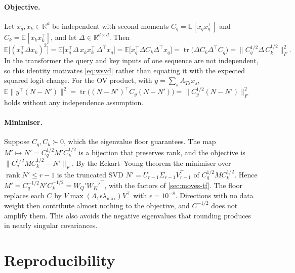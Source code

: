 \documentclass[11pt,a4paper]{article}
\theoremstyle{definition}
\newcommand{\R}{\mathbb{R}}
\newcommand{\E}{\mathbb{E}}
\DeclareMathOperator{\rank}{rank}
\begin{document}
\paragraph{Objective.} Let $x_q,x_k\in\R^{d}$ be independent with second moments
$C_q=\E[x_qx_q^{\top}]$ and $C_k=\E[x_kx_k^{\top}]$, and let $\Delta\in\R^{d\times d}$.
Then
\[
\E\big[(x_q^{\top}\Delta x_k)^2\big]
=\E\big[x_q^{\top}\Delta\,x_kx_k^{\top}\,\Delta^{\top}x_q\big]
=\E\big[x_q^{\top}\Delta C_k\Delta^{\top}x_q\big]
=\operatorname{tr}\big(\Delta C_k\Delta^{\top}C_q\big)
=\big\|C_q^{1/2}\Delta\,C_k^{1/2}\big\|_F^{2}.
\]
In the transformer the query and key inputs of one sequence are not independent, so
this identity motivates \eqref{eq:wsvd} rather than equating it with the expected
squared logit change. For the OV product, with $y=\sum_sA_{Ts}x_s$,
$\E\|y^{\top}(N-N')\|^2=\operatorname{tr}\big((N-N')^{\top}C_y(N-N')\big)=
\|C_y^{1/2}(N-N')\|_F^2$ holds without any independence assumption.

\paragraph{Minimiser.} Suppose $C_q,C_k\succ0$, which the eigenvalue floor guarantees.
The map $M'\mapsto N'=C_q^{1/2}M'C_k^{1/2}$ is a bijection that preserves rank, and the
objective is $\|C_q^{1/2}MC_k^{1/2}-N'\|_F$. By the Eckart--Young theorem the minimiser
over $\rank N'\le r-1$ is the truncated SVD $N'=U_{r-1}\Sigma_{r-1}V_{r-1}^{\top}$ of
$C_q^{1/2}MC_k^{1/2}$. Hence $M'=C_q^{-1/2}N'C_k^{-1/2}=W_Q'W_K'^{\top}$, with the
factors of \cref{sec:moves-tf}. The floor replaces each $C$ by
$V\max(\Lambda,\epsilon\lambda_{\max})V^{\top}$ with $\epsilon=10^{-8}$. Directions with
no data weight then contribute almost nothing to the objective, and $C^{-1/2}$ does not
amplify them. This also avoids the negative eigenvalues that rounding produces in
nearly singular covariances.

\section{Reproducibility}
\label{app:repro}
\sloppy
\end{document}
